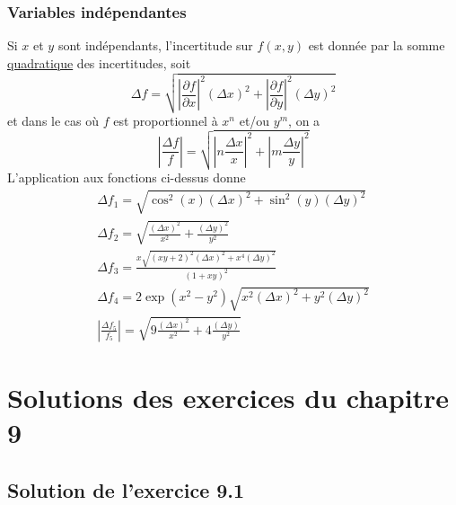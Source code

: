 \subsubsection*{Variables indépendantes}

Si $x$ et $y$ sont indépendants, l'incertitude sur $f(x,y)$ est donnée par la somme \underline{quadratique} des incertitudes, soit
$$
\Delta f=\sqrt{\left|\frac{\partial f}{\partial x}\right|^2(\Delta x)^2+
\left|\frac{\partial f}{\partial y}\right|^2(\Delta y)^2}
$$
et dans le cas où $f$ est proportionnel à $x^n$ et/ou $y^m$, on a
$$
\left|\frac{\Delta f}{f}\right|=\sqrt{\left|n\frac{\Delta x}{x}\right|^2+
\left|m\frac{\Delta y}{y}\right|^2}
$$
L'application aux fonctions ci-dessus donne
\begin{gather*}
\Delta f_1=\sqrt{\cos^2{(x)}(\Delta x)^2+\sin^2{(y)}(\Delta y)^2}\\
\Delta f_2=\sqrt{\frac{(\Delta x)^2}{x^2}+\frac{(\Delta y)^2}{y^2}}\\
\Delta f_3=\frac{x\sqrt{(xy+2)^2(\Delta x)^2+x^4(\Delta y)^2}}{(1+xy)^2}\\
\Delta f_4=2\exp(x^2-y^2)\sqrt{x^2(\Delta x)^2+y^2(\Delta y)^2}\\
\left|\frac{\Delta f_5}{f_5}\right|=\sqrt{9\frac{(\Delta x)^2}{x^2}+4\frac{(\Delta y)}{y^2}}
\end{gather*}

\section{Solutions des exercices du chapitre 9}

\subsection*{Solution de l'exercice 9.1}

